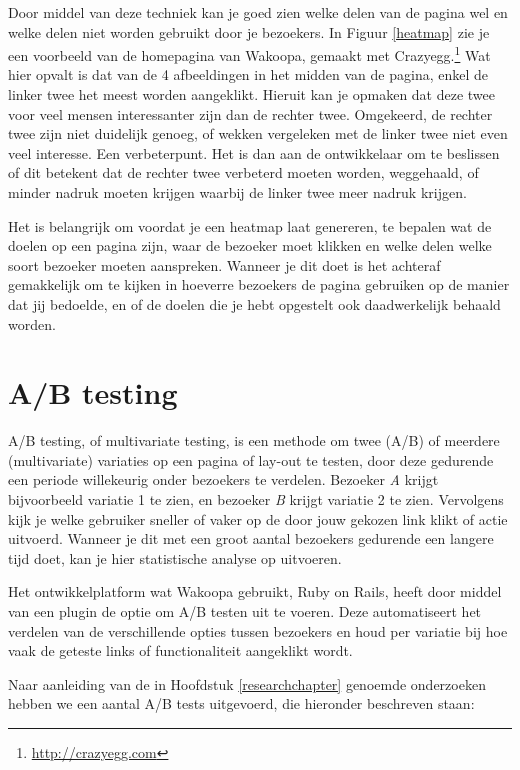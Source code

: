 \documentclass[a4paper, 10pt, pdftex]{report}
\begin{document}
    Door middel van deze techniek kan je goed zien welke delen van de pagina wel en welke delen niet worden gebruikt door je bezoekers. In Figuur \ref{heatmap} zie je een voorbeeld van de homepagina van Wakoopa, gemaakt met Crazyegg.\footnote{\url{http://crazyegg.com}} Wat hier opvalt is dat van de 4 afbeeldingen in het midden van de pagina, enkel de linker twee het meest worden aangeklikt. Hieruit kan je opmaken dat deze twee voor veel mensen interessanter zijn dan de rechter twee. Omgekeerd, de rechter twee zijn niet duidelijk genoeg, of wekken vergeleken met de linker twee niet even veel interesse. Een verbeterpunt. Het is dan aan de ontwikkelaar om te beslissen of dit betekent dat de rechter twee verbeterd moeten worden, weggehaald, of minder nadruk moeten krijgen waarbij de linker twee meer nadruk krijgen.

    Het is belangrijk om voordat je een heatmap laat genereren, te bepalen wat de doelen op een pagina zijn, waar de bezoeker moet klikken en welke delen welke soort bezoeker moeten aanspreken. Wanneer je dit doet is het achteraf gemakkelijk om te kijken in hoeverre bezoekers de pagina gebruiken op de manier dat jij bedoelde, en of de doelen die je hebt opgestelt ook daadwerkelijk behaald worden.


    \section{A/B testing}
    A/B testing, of multivariate testing, is een methode om twee (A/B) of meerdere (multivariate) variaties op een pagina of lay-out te testen, door deze gedurende een periode willekeurig onder bezoekers te verdelen. Bezoeker \emph{A} krijgt bijvoorbeeld variatie 1 te zien, en bezoeker \emph{B} krijgt variatie 2 te zien. Vervolgens kijk je welke gebruiker sneller of vaker op de door jouw gekozen link klikt of actie uitvoerd. Wanneer je dit met een groot aantal bezoekers gedurende een langere tijd doet, kan je hier statistische analyse op uitvoeren.

   Het ontwikkelplatform wat Wakoopa gebruikt, Ruby on Rails, heeft door middel van een plugin de optie om A/B testen uit te voeren. Deze automatiseert het verdelen van de verschillende opties tussen bezoekers en houd per variatie bij hoe vaak de geteste links of functionaliteit aangeklikt wordt.

    Naar aanleiding van de in Hoofdstuk \ref{researchchapter} genoemde onderzoeken hebben we een aantal A/B tests uitgevoerd, die hieronder beschreven staan:
\end{document}
